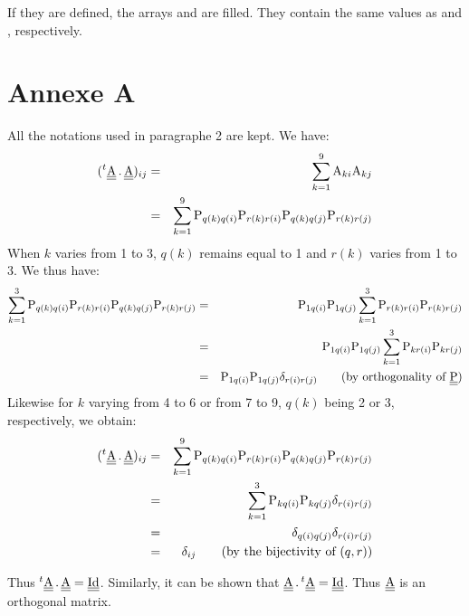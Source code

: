 If they are defined, the arrays  and 
are filled. They contain the same values as  and
, respectively.


\section*{Annexe A}

All the notations used in paragraphe 2 are kept. We have:
\begin{eqnarray}
(^t\underline{\underline{\textrm{A}}}\,.\,\underline{\underline{\textrm{A}}})_{ij}
& = & \sum_{k=1}^9\textrm{A}_{ki}\textrm{A}_{kj}\nonumber\\
& = & \sum_{k=1}^9
\textrm{P}_{q(k)q(i)}\textrm{P}_{r(k)r(i)}\textrm{P}_{q(k)q(j)}\textrm{P}_{r(k)r(j)}
\end{eqnarray}
When $k$ varies from 1 to 3, $q(k)$ remains equal to 1 and $r(k)$ varies from 1
to 3. We thus have:
\begin{eqnarray}
\sum_{k=1}^3
\textrm{P}_{q(k)q(i)}\textrm{P}_{r(k)r(i)}\textrm{P}_{q(k)q(j)}\textrm{P}_{r(k)r(j)}
&=&\textrm{P}_{1q(i)}\textrm{P}_{1q(j)}\sum_{k=1}^3
\textrm{P}_{r(k)r(i)}\textrm{P}_{r(k)r(j)}\nonumber\\
&=&\textrm{P}_{1q(i)}\textrm{P}_{1q(j)}\sum_{k=1}^3
\textrm{P}_{kr(i)}\textrm{P}_{kr(j)}\\
&=&\textrm{P}_{1q(i)}\textrm{P}_{1q(j)}\delta_{r(i)r(j)}\qquad\text{(by
orthogonality of $\underline{\underline{\textrm{P}}}$)}\nonumber
\end{eqnarray}
Likewise for $k$ varying from 4 to 6 or from 7 to 9, $q(k)$ being 2 or 3, respectively,
 we obtain:
\begin{eqnarray}
(^t\underline{\underline{\textrm{A}}}\,.\,\underline{\underline{\textrm{A}}})_{ij}
&=&
\sum_{k=1}^9
\textrm{P}_{q(k)q(i)}\textrm{P}_{r(k)r(i)}\textrm{P}_{q(k)q(j)}\textrm{P}_{r(k)r(j)}
\nonumber\\
&=&
\sum_{k=1}^3\textrm{P}_{kq(i)}\textrm{P}_{kq(j)}\delta_{r(i)r(j)}\\
&=&\delta_{q(i)q(j)}\delta_{r(i)r(j)}\nonumber\\
&=&\delta_{ij}\qquad
\text{(by the bijectivity of $(q,r)$)}\nonumber
\end{eqnarray}

Thus $^t\underline{\underline{\textrm{A}}}\,.\,\underline{\underline{\textrm{A}}}=\underline{\underline{\textrm{Id}}}$. Similarly, it can be shown that
$\underline{\underline{\textrm{A}}}\,.\,^t\underline{\underline{\textrm{A}}}=\underline{\underline{\textrm{Id}}}$. Thus $\underline{\underline{\textrm{A}}}$ is an orthogonal matrix.



